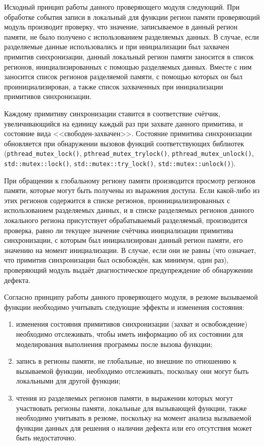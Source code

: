Исходный принцип работы данного проверяющего модуля следующий. При обработке события записи в локальный для функции регион памяти проверяющий модуль производит проверку, что значение, записываемое в данный регион памяти, не было получено с использованием разделяемых данных. В случае, если разделяемые данные использовались и при инициализации был захвачен примитив синхронизации, данный локальный регион памяти заносится в список регионов, инициализированных с помощью разделяемых данных. Вместе с ним заносится список регионов разделяемой памяти, с помощью которых он был проинициализирован, а также список захваченных при инициализации примитивов синхронизации.

Каждому примитиву синхронизации ставится в соответствие счётчик, увеличивающийся на единицу каждый раз при захвате данного примитива, и состояние вида <<свободен-захвачен>>. Состояние примитива синхронизации обновляется при обнаружении вызовов функций соответствующих библиотек (\texttt{pthread\_mutex\_lock()}, \texttt{pthread\_mutex\_trylock()}, \texttt{pthread\_mutex\_unlock()}, \texttt{std::mutex::lock()}, \texttt{std::mutex::try\_lock()}, \texttt{std::mutex::unlock()}).

При обращении к глобальному региону памяти производится просмотр регионов памяти, которые могут быть получены из выражения доступа. Если какой-либо из этих регионов содержится в списке регионов, проинициализированных с использованием разделяемых данных, и в списке разделяемых регионов данного локального региона присутствует обрабатываемый разделяемый, производится проверка, равно ли текущее значение счётчика инициализации примитива синхронизации, с которым был инициализирован данный регион памяти, его значению на момент инициализации. В случае, если они не равны (что означает, что примитив синхронизации был освобождён, как минимум, один раз), проверяющий модуль выдаёт диагностическое предупреждение об обнаружении дефекта.

Согласно принципу работы данного проверяющего модуля, в резюме вызываемой функции необходимо учитывать следующие эффекты и изменения состояния:

\begin{enumerate}
 \item изменения состояния примитивов синхронизации (захват и освобождение) необходимо отслеживать, чтобы иметь информацию об их состоянии для моделирования выполнения программы после вызова функции;
 \item запись в регионы памяти, не глобальные, но внешние по отношению к вызываемой функции, необходимо отслеживать, поскольку они могут быть локальными для другой функции;
 \item чтения из разделяемых регионов памяти, в выражении которых могут участвовать регионы памяти, локальные для вызывающей функции, также необходимо учитывать в резюме, поскольку на момент анализа вызываемой функции данных для решения о наличии дефекта или его отсутствия может быть недостаточно.
\end{enumerate}

